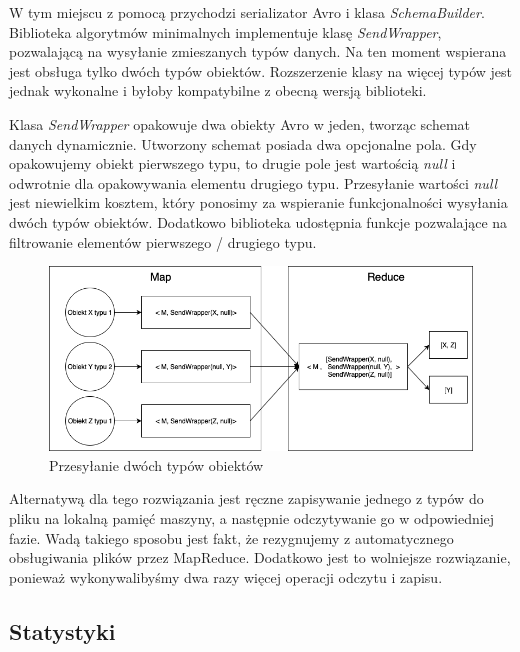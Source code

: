 \documentclass{pracamgr}
\begin{document}
W tym miejscu z pomocą przychodzi serializator Avro i klasa \textit{SchemaBuilder}. Biblioteka algorytmów minimalnych implementuje klasę \textit{SendWrapper}, pozwalającą na wysyłanie zmieszanych typów danych. Na ten moment wspierana jest obsługa tylko dwóch typów obiektów. Rozszerzenie klasy na więcej typów jest jednak wykonalne i byłoby kompatybilne z obecną wersją biblioteki.

Klasa \textit{SendWrapper} opakowuje dwa obiekty Avro w jeden, tworząc schemat danych dynamicznie. Utworzony schemat posiada dwa opcjonalne pola. Gdy opakowujemy obiekt pierwszego typu, to drugie pole jest wartością \textit{null} i odwrotnie dla opakowywania elementu drugiego typu. Przesyłanie wartości \textit{null} jest niewielkim kosztem, który ponosimy za wspieranie funkcjonalności wysyłania dwóch typów obiektów. Dodatkowo biblioteka udostępnia funkcje pozwalające na filtrowanie elementów pierwszego / drugiego typu.

\begin{figure}[H]
    \caption{Przesyłanie dwóch typów obiektów}
    \includegraphics[width=15cm]{sending_multiple_typles.png}
\end{figure}

Alternatywą dla tego rozwiązania jest ręczne zapisywanie jednego z typów do pliku na lokalną pamięć maszyny, a następnie odczytywanie go w odpowiedniej fazie. Wadą takiego sposobu jest fakt, że rezygnujemy z automatycznego obsługiwania plików przez MapReduce. Dodatkowo jest to wolniejsze rozwiązanie, ponieważ wykonywalibyśmy dwa razy więcej operacji odczytu i zapisu.

\subsection{Statystyki}
\end{document}
